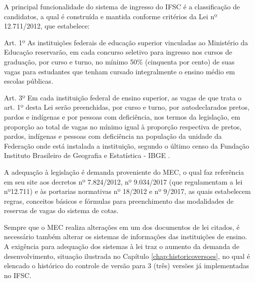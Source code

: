  A principal funcionalidade do sistema de ingresso do \gls{IFSC} é a classificação de candidatos, a qual é construída e mantida conforme critérios da Lei nº 12.711/2012, que estabelece:
 \begin{citacao}
 Art. 1º As instituições federais de educação superior vinculadas ao Ministério da Educação reservarão, em cada concurso seletivo para ingresso nos cursos de graduação, por curso e turno, no mínimo 50\% (cinquenta por cento) de suas vagas para estudantes que tenham cursado integralmente o ensino médio em escolas públicas.
 
 Art. 3º Em cada instituição federal de ensino superior, as vagas de que trata o art. 1º desta Lei serão preenchidas, por curso e turno, por autodeclarados pretos, pardos e indígenas e por pessoas com deficiência, nos termos da legislação, em proporção ao total de vagas no mínimo igual à proporção respectiva de pretos, pardos, indígenas e pessoas com deficiência na população da unidade da Federação onde está instalada a instituição, segundo o último censo da Fundação Instituto Brasileiro de Geografia e Estatística - IBGE \cite{leicotas}.  
 \end{citacao}
 
 A adequação à legislação é demanda proveniente do \gls{MEC}, o qual faz referência em seu site aos decretos nº 7.824/2012, nº 9.034/2017 (que regulamentam a lei nº12.711) e às portarias normativas nº 18/2012 e nº 9/2017, as quais estabelecem regras, conceitos básicos e fórmulas para preenchimento das modalidades de reservas de vagas do sistema de cotas. 
 
 Sempre que o \gls{MEC} realiza alterações em um dos documentos de lei citados, é necessário também alterar os sistemas de informações das instituições de ensino. A exigência para adequação dos sistemas à lei traz o aumento da demanda de desenvolvimento, situação ilustrada no Capítulo  \ref{chap:historicoversoes}, no qual é elencado o histórico do controle de versão para 3 (três) versões já implementadas no \gls{IFSC}.
 
 

 
 